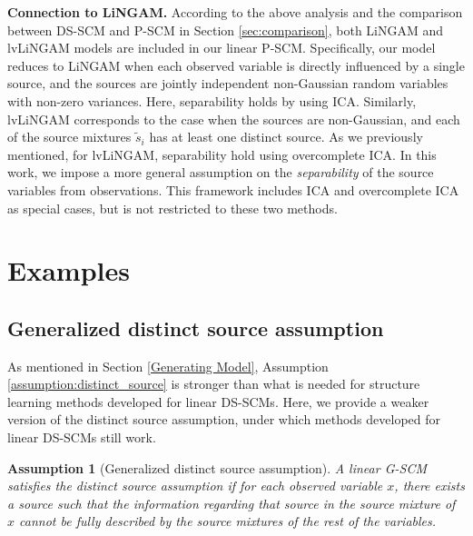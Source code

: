 \documentclass[12pt]{article}
\newtheorem{assumption}{Assumption}
\newcommand{\bW}{\mathbf{W}}
\begin{document}
{\bf Connection to LiNGAM.}
According to the above analysis and the comparison between DS-SCM and P-SCM in Section \ref{sec:comparison}, both LiNGAM and lvLiNGAM models are included in our linear P-SCM. Specifically, our model reduces to LiNGAM when each observed variable is directly influenced by a single source, and the sources are jointly independent non-Gaussian random variables with non-zero variances. Here, separability holds by using ICA. Similarly, lvLiNGAM corresponds to the case when the sources are non-Gaussian, and each of the source mixtures $\tilde{s}_i$ has at least one distinct source. As we previously mentioned, for lvLiNGAM, separability hold using overcomplete ICA. 
In this work, we impose a more general assumption on the {\it{separability}} of the source variables from observations. This framework includes ICA and overcomplete ICA as special cases, but is not restricted to these two methods.

\section{Examples}
\subsection{Generalized distinct source assumption} \label{app:distinct_source}
As mentioned in Section \ref{Generating Model}, Assumption \ref{assumption:distinct_source} is stronger than what is needed for structure learning methods developed for linear DS-SCMs. Here, we provide a weaker version of the distinct source assumption, under which methods developed for linear DS-SCMs still work.

\begin{assumption}[Generalized distinct source assumption]
\label{assumption:distinct_source_generalized}
A linear G-SCM satisfies the distinct source assumption if for each observed variable $x$, there exists a source such that the information regarding that source in the source mixture of $x$ cannot be fully described by the source mixtures of the rest of the variables.
\end{assumption}
\end{document}
